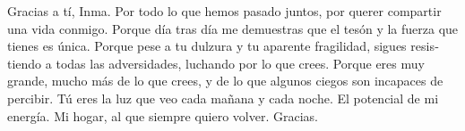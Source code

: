 \begin{otherlanguage}{spanish}
	Gracias a tí, Inma. Por todo lo que hemos pasado juntos, por querer compartir una vida conmigo. Porque día tras día me demuestras que el tesón y la fuerza que tienes es única. Porque pese a tu dulzura y tu aparente fragilidad, sigues resistiendo a todas las adversidades, luchando por lo que crees. Porque eres muy grande, mucho más de lo que crees, y de lo que algunos ciegos son incapaces de percibir. Tú eres la luz que veo cada mañana y cada noche. El potencial de mi energía. Mi hogar, al que siempre quiero volver. Gracias.
	
\end{otherlanguage}
%


